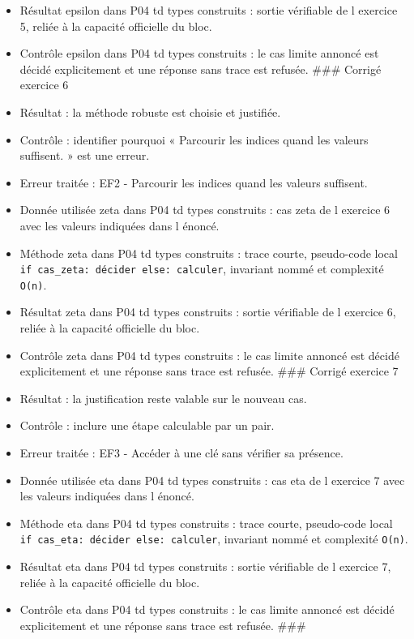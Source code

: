 \begin{itemize}
  et complexité \texttt{O(n)}.
\item
  Résultat epsilon dans P04 td types construits : sortie vérifiable de l
  exercice 5, reliée à la capacité officielle du bloc.
\item
  Contrôle epsilon dans P04 td types construits : le cas limite annoncé
  est décidé explicitement et une réponse sans trace est refusée. \#\#\#
  Corrigé exercice 6
\item
  Résultat : la méthode robuste est choisie et justifiée.
\item
  Contrôle : identifier pourquoi « Parcourir les indices quand les
  valeurs suffisent. » est une erreur.
\item
  Erreur traitée : EF2 - Parcourir les indices quand les valeurs
  suffisent.
\item
  Donnée utilisée zeta dans P04 td types construits : cas zeta de l
  exercice 6 avec les valeurs indiquées dans l énoncé.
\item
  Méthode zeta dans P04 td types construits : trace courte, pseudo-code
  local \texttt{if\ cas\_zeta:\ décider\ else:\ calculer}, invariant
  nommé et complexité \texttt{O(n)}.
\item
  Résultat zeta dans P04 td types construits : sortie vérifiable de l
  exercice 6, reliée à la capacité officielle du bloc.
\item
  Contrôle zeta dans P04 td types construits : le cas limite annoncé est
  décidé explicitement et une réponse sans trace est refusée. \#\#\#
  Corrigé exercice 7
\item
  Résultat : la justification reste valable sur le nouveau cas.
\item
  Contrôle : inclure une étape calculable par un pair.
\item
  Erreur traitée : EF3 - Accéder à une clé sans vérifier sa présence.
\item
  Donnée utilisée eta dans P04 td types construits : cas eta de l
  exercice 7 avec les valeurs indiquées dans l énoncé.
\item
  Méthode eta dans P04 td types construits : trace courte, pseudo-code
  local \texttt{if\ cas\_eta:\ décider\ else:\ calculer}, invariant
  nommé et complexité \texttt{O(n)}.
\item
  Résultat eta dans P04 td types construits : sortie vérifiable de l
  exercice 7, reliée à la capacité officielle du bloc.
\item
  Contrôle eta dans P04 td types construits : le cas limite annoncé est
  décidé explicitement et une réponse sans trace est refusée. \#\#\#

\end{itemize}

